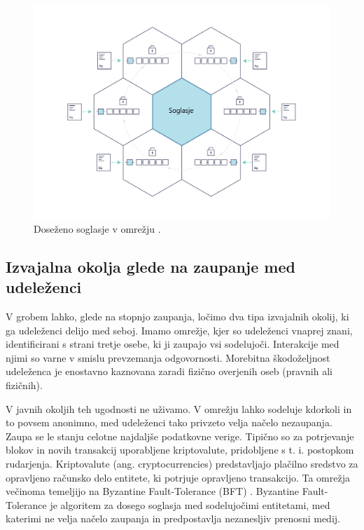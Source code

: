 \documentclass[a4paper, 12pt]{book}
\begin{document}
\begin{figure}[h]
	\includegraphics[width=1.0\textwidth]{slike/consensus.png}
	\caption{Doseženo soglasje v omrežju \cite{hyperledgerDocs}.}
	\label{consensus}
\end{figure}


\subsection{Izvajalna okolja glede na zaupanje med udeleženci}
V grobem lahko, glede na stopnjo zaupanja, ločimo dva tipa izvajalnih okolij, ki ga udeleženci delijo med seboj.
Imamo omrežje, kjer so udeleženci vnaprej znani, identificirani s strani tretje osebe, ki ji zaupajo vsi sodelujoči.
Interakcije med njimi so varne v smislu prevzemanja odgovornosti.
Morebitna škodoželjnost udeleženca je enostavno kaznovana zaradi fizično overjenih oseb (pravnih ali fizičnih).

V javnih okoljih teh ugodnosti ne uživamo.
V omrežju lahko sodeluje kdorkoli in to povsem anonimno,
med udeleženci tako privzeto velja načelo nezaupanja.
Zaupa se le stanju celotne najdaljše podatkovne verige.
Tipično so za potrjevanje blokov in novih transakcij uporabljene kriptovalute, pridobljene s t. i. postopkom rudarjenja.
Kriptovalute (ang. cryptocurrencies) predstavljajo plačilno sredstvo za opravljeno računsko delo entitete, ki potrjuje opravljeno transakcijo.
Ta omrežja večinoma temeljijo na Byzantine Fault-Tolerance (BFT) \cite{hyperledgerDocs, castro1999practical}.
Byzantine Fault-Tolerance je algoritem za dosego soglasja med sodelujočimi entitetami, med katerimi ne velja načelo zaupanja in  predpostavlja nezanesljiv prenosni medij.
\end{document}
